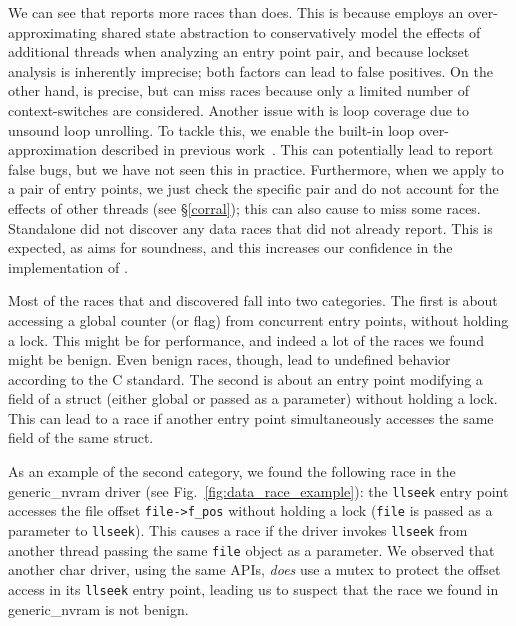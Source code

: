 We can see that \whoop reports more races than \corral does. This is because \whoop employs an over-approximating shared state abstraction to conservatively model the effects of additional threads when analyzing an entry point pair, and because lockset analysis is inherently imprecise; both factors can lead to false positives.  On the other hand, \corral is precise, but can miss races because only a limited number of context-switches are considered.  Another issue with \corral is loop coverage due to unsound loop unrolling. To tackle this, we enable the built-in loop over-approximation described in previous work~\cite{lal2014powering}. This can potentially lead \corral to report false bugs, but we have not seen this in practice. Furthermore, when we apply \corral to a pair of entry points, we just check the specific pair and do not account for the effects of other threads (see \S\ref{corral}); this can also cause \corral to miss some races. Standalone \corral did not discover any data races that \whoop did not already report.  This is expected, as \whoop aims for soundness, and this increases our confidence in the implementation of \whoop.

Most of the races that \whoop and \corral discovered fall into two categories. The first is about accessing a global counter (or flag) from concurrent entry points, without holding a lock. This might be for performance, and indeed a lot of the races we found might be benign. Even benign races, though, lead to undefined behavior according to the C standard.
%
%
The second is about an entry point modifying a field of a struct (either global or passed as a parameter) without holding a lock. This can lead to a race if another entry point simultaneously accesses the same field of the same struct.

As an example of the second category, we found the following race in the generic\_nvram driver (see Fig.~\ref{fig:data_race_example}): the \texttt{llseek} entry point accesses the file offset \texttt{file->f\_pos} without holding a lock (\texttt{file} is passed as a parameter to \texttt{llseek}). This causes a race if the driver invokes \texttt{llseek} from another thread passing the same \texttt{file} object as a parameter.  We observed that another char driver, using the same APIs, \emph{does} use a mutex to protect the offset access in its \texttt{llseek} entry point, leading us to suspect that the race we found in generic\_nvram is not benign.

